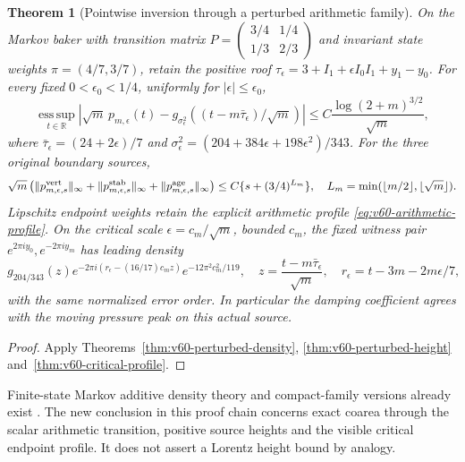 \documentclass[11pt,reqno]{amsart}
\numberwithin{equation}{section}
\newtheorem{leadtheorem}{Theorem}
\theoremstyle{definition}\newtheorem{definition}[theorem]{Definition}
\theoremstyle{remark}\newtheorem{remark}[theorem]{Remark}
\newcommand{\R}{\mathbb R}\newcommand{\Z}{\mathbb Z}\newcommand{\T}{\mathbb T}
\begin{document}
\begin{leadtheorem}[Pointwise inversion through a perturbed arithmetic family]
\label{thm:intro-v60-perturbed}
On the Markov baker with transition matrix
$P=\left(\begin{smallmatrix}3/4&1/4\\1/3&2/3\end{smallmatrix}\right)$
and invariant state weights $\pi=(4/7,3/7)$, retain the positive roof
$\tau_\epsilon=3+I_1+\epsilon I_0I_1+y_1-y_0$.
For every fixed $0<\epsilon_0<1/4$, uniformly for
$|\epsilon|\le\epsilon_0$,
\[
 \operatorname*{ess\,sup}_{t\in\R}
 \left|\sqrt m\,p_{m,\epsilon}(t)
 -g_{\sigma_\epsilon^2}((t-m\bar\tau_\epsilon)/\sqrt m)\right|
 \le C\frac{\log(2+m)^{3/2}}{\sqrt m},
\]
where $\bar\tau_\epsilon=(24+2\epsilon)/7$ and
$\sigma_\epsilon^2=(204+384\epsilon+198\epsilon^2)/343$.
For the three original boundary sources,
\[
 \sqrt m\left(\|p_{m,\epsilon,s}^{\rm vert}\|_\infty
 +\|p_{m,\epsilon,s}^{\rm stab}\|_\infty
 +\|p_{m,\epsilon,s}^{\rm age}\|_\infty\right)
 \le C\{s+(3/4)^{L_m}\},\quad
 L_m=\min(\lfloor m/2\rfloor,\lfloor\sqrt m\rfloor).
\]
Lipschitz endpoint weights retain the explicit arithmetic profile
\eqref{eq:v60-arithmetic-profile}. On the critical scale
$\epsilon=c_m/\sqrt m$, bounded $c_m$, the fixed witness pair
$e^{2\pi iy_0},e^{-2\pi iy_m}$ has leading density
\[
 g_{204/343}(z)
 e^{-2\pi i(r_\epsilon-(16/17)c_mz)}e^{-12\pi^2c_m^2/119},
 \quad z=\frac{t-m\bar\tau_\epsilon}{\sqrt m},\quad
 r_\epsilon=t-3m-2m\epsilon/7,
\]
with the same normalized error order. In particular the damping
coefficient agrees with the moving pressure peak on this actual source.
\end{leadtheorem}
\begin{proof}
Apply Theorems~\ref{thm:v60-perturbed-density},
\ref{thm:v60-perturbed-height} and~\ref{thm:v60-critical-profile}.
\end{proof}

Finite-state Markov additive density theory and compact-family versions
already exist \cite{HL,HLuniform}. The new conclusion in this proof
chain concerns exact coarea through the scalar arithmetic transition,
positive source heights and the visible critical endpoint profile.
It does not assert a Lorentz height bound by analogy.
\end{document}
